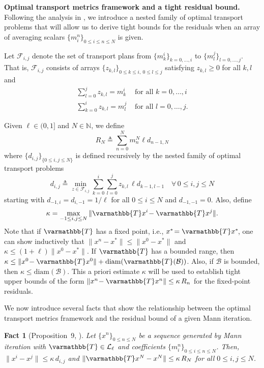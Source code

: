 \documentclass[pdflatex,sn-mathphys-num]{sn-jnl}%
\newcommand{\cB}{\mathcal{B}}
\newcommand{\cL}{\mathcal{L}}
\newcommand{\NN}{\mathbb{N}}
\newcommand{\opT}{{\varmathbb{T}}}
\theoremstyle{thmstyleone}%
\theoremstyle{thmstyletwo}%
\newtheorem{fact}{Fact}
\theoremstyle{thmstylethree}%
\begin{document}
\vspace{0.2in}

\noindent\textbf{Optimal transport metrics framework and a tight residual bound.}
Following the analysis in \cite{baillon1992optimal, aygen1995optimal, bc2018, bravo2021universal, cc2023, bravo2026minimax, bravo2026krasnosel},
we introduce a nested family of optimal transport problems that will allow us to derive tight bounds for the residuals when an array of averaging scalars
$\{m^n_i\}_{0\le i \le n \le N}$ is given.

    Let $\mathcal{F}_{i,j}$ denote the set of transport plans from $\{m_k^i\}_{k=0,\dots,i}$ to $\{m_l^j\}_{l=0,\dots,j}$. That is, $\mathcal{F}_{i,j}$ consists of arrays $\{z_{k,l}\}_{0\le k\le i,\ 0\le l\le j}$ satisfying $z_{k,l}\ge0$ for all $k,l$ and
\begin{align*}
    \mbox{$\sum^j_{l=0} z_{k,l}$} = m^i_k &\mbox{ for all } k=0,\dots, i\\[1.5ex]
        \mbox{$\sum^i_{k=0} z_{k,l}$} = m^j_l & \mbox{ for all } l=0,\dots, j.
\end{align*}
    
Given $\ell \in (0,1]$ and $N\in \NN$, we define
\[R_N\triangleq\sum^N_{n=0} m^N_n \ell d_{n-1,N}\] where $\{d_{i,j}\}_{\{0\le i,j \le N\}}$ is defined recursively by the nested family of optimal transport problems
\[ d_{i,j} \triangleq \min_{z \in \mathcal{F}_{i,j}}\sum^i_{k=0}\sum^j_{l=0}  z_{k,l}\, \ell d_{k-1,l-1} \quad \forall\, 0\le i,j\le N\] 
starting with $d_{-1,i}=d_{i,-1}=1/\ell$ for all $0 \le i\le N$ and $d_{-1,-1}=0$. Also, define
\[\kappa=\max_{-1\le i,j\le N }{\|\opT x^i\!-\opT x^j\|}.\] 
Note that if $\opT$ has a fixed point, i.e., $x^*\!=\opT x^*\!$, one can show inductively that $\|x^n\!-x^*\|\leq\|x^0\!-x^*\|$ and $\kappa \le (1\!+\!\ell)\|x^0\!-x^*\|$. If $\opT$ has a bounded range, then $\kappa \le \|x^0\!-\opT x^0\|+\text{diam}(\opT(\cB))$. Also, if $\cB$ is bounded, then $\kappa \le \text{diam}(\cB)$.
This a priori estimate $\kappa$ will be used to establish tight upper bounds of the form $\|x^n\!-\opT x^n\|\leq\kappa\,R_n$ for the fixed-point residuals.


We now introduce several facts that show the relationship between the optimal transport metrics framework and the residual bound of a given Mann iteration.

\begin{fact}[Proposition~9, \cite{bravo2026minimax}]\label{fact:1}
 Let $\{x^n\}_{0\le n\le N}$ be a sequence generated by Mann iteration with $\opT\in\cL_\ell$ and coefficients $\{m^n_i\}_{0 \le i \le n \le N}$. Then, $\|x^i-x^j\|\leq \kappa\,d_{i,j}$ and $\|\opT x^N-x^N\|\le \kappa\,R_N$ for all $0 \le i,j\le N$.
\end{fact}
\end{document}
